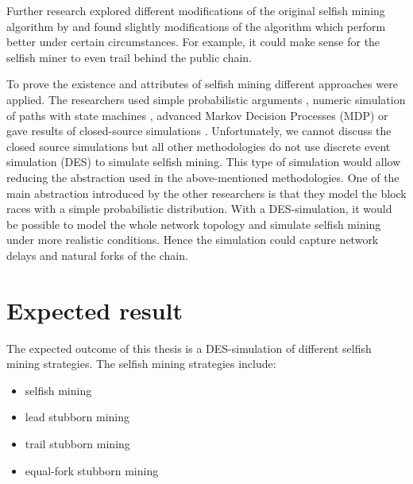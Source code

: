 \documentclass{scrartcl}
\begin{document}

Further research \cite{nayak2016stubborn,sapirshtein2016optimal, gervais2015tampering, gervais2016security, bahack2013theoretical} explored different modifications of the original selfish mining algorithm by \citeauthor{eyal2014majority} and found slightly modifications of the algorithm which perform better under certain circumstances. For example, it could make sense for the selfish miner to even trail behind the public chain.

To prove the existence and attributes of selfish mining different approaches were applied. The researchers used simple probabilistic arguments \cite{eyal2014majority, bahack2013theoretical}, numeric simulation of paths with state machines \cite{gervais2015tampering, nayak2016stubborn}, advanced Markov Decision Processes (MDP) \cite{sapirshtein2016optimal, gervais2016security} or gave results of closed-source simulations \cite{eyal2014majority, sapirshtein2016optimal}. Unfortunately, we cannot discuss the closed source simulations but all other methodologies do not use discrete event simulation (DES) \cite{fishman1978principles} to simulate selfish mining. This type of simulation would allow reducing the abstraction used in the above-mentioned methodologies. One of the main abstraction introduced by the other researchers is that they model the block races with a simple probabilistic distribution. With a DES-simulation, it would be possible to model the whole network topology and simulate selfish mining under more realistic conditions. Hence the simulation could capture network delays and natural forks of the chain.

\section{Expected result}
The expected outcome of this thesis is a DES-simulation of different selfish mining strategies. The selfish mining strategies include:
\begin{itemize}
\item selfish mining \cite{eyal2014majority}
\item lead stubborn mining \cite{nayak2016stubborn}
\item trail stubborn mining \cite{nayak2016stubborn}
\item equal-fork stubborn mining \cite{nayak2016stubborn}
\end{itemize}
\end{document}

